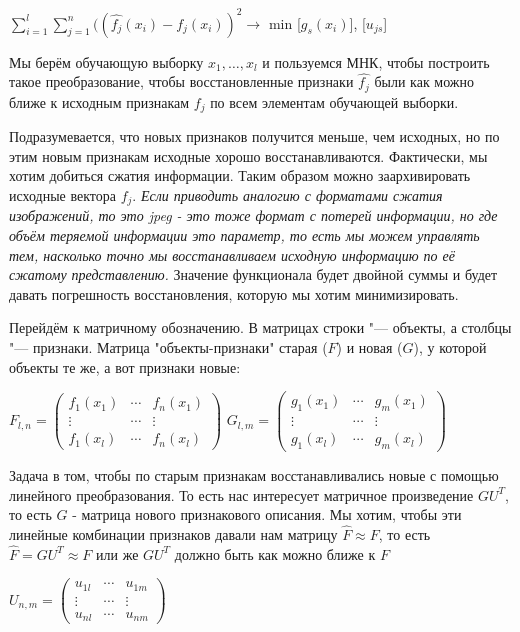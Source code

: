 $\displaystyle\sum_{i=1}^{l}\displaystyle\sum_{j=1}^{n} ((\hat{f_j}(x_i)-f_j(x_i))^2 \rightarrow$ min [$g_s(x_i)$], [$u_{js}$] \par

Мы берём обучающую выборку $x_1, \dotsc, x_l$ и пользуемся МНК, чтобы построить такое преобразование, чтобы восстановленные признаки $\hat{f_j}$ были как можно ближе к исходным признакам $f_j$ по всем элементам обучающей выборки.\par Подразумевается, что новых признаков получится меньше, чем исходных, но по этим новым признакам исходные хорошо восстанавливаются. Фактически, мы хотим добиться сжатия информации. Таким образом можно заархивировать исходные вектора $f_j$. \textit{Если приводить аналогию с форматами сжатия изображений, то это jpeg - это тоже формат с потерей информации, но где объём теряемой информации это параметр, то есть мы можем управлять тем, насколько точно мы восстанавливаем исходную информацию по её сжатому представлению.} Значение функционала будет двойной суммы и будет давать погрешность восстановления, которую мы хотим минимизировать.

Перейдём к матричному обозначению. В матрицах строки "--- объекты, а столбцы "--- признаки. Матрица "объекты-признаки" старая ($F$) и новая ($G$), у которой объекты те же, а вот признаки новые: \par
$F_{l,n} =
    \begin{pmatrix}
        f_1(x_1) & \cdots & f_n(x_1) \\
        \vdots   & \cdots & \vdots   \\
        f_1(x_l) & \cdots & f_n(x_l)
    \end{pmatrix}$
$G_{l,m} =
    \begin{pmatrix}
        g_1(x_1) & \cdots & g_m(x_1) \\
        \vdots   & \cdots & \vdots   \\
        g_1(x_l) & \cdots & g_m(x_l)
    \end{pmatrix}$

Задача в том, чтобы по старым признакам восстанавливались новые с помощью линейного преобразования. То есть нас интересует матричное произведение $GU^T$, то есть $G$ - матрица нового признакового описания.
Мы хотим, чтобы эти линейные комбинации признаков давали нам матрицу $\hat{F} \approx F$, то есть $\hat{F} = GU^T  \approx F$ или же $GU^T$ должно быть как можно ближе к $F$ \par
$U_{n,m} =
    \begin{pmatrix}
        u_{1l} & \cdots & u_{1m} \\
        \vdots & \cdots & \vdots \\
        u_{nl} & \cdots & u_{nm}
    \end{pmatrix}$\par

